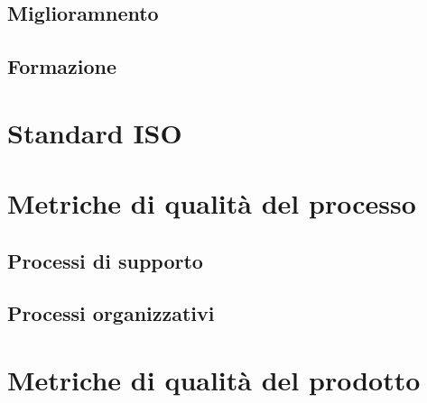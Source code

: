 \documentclass[italian,12pt]{article} %
\begin{document}
\subsection{Miglioramnento}
\subsection{Formazione}

\section{Standard ISO}

\section{Metriche di qualità del processo}
\subsection{Processi di supporto}
\subsection{Processi organizzativi}

\section{Metriche di qualità del prodotto}
\end{document}
